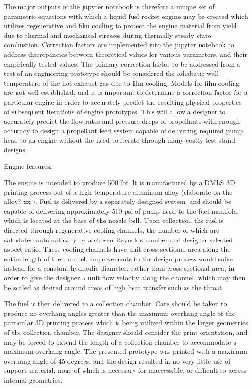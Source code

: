 \documentclass[]{aiaa-tc}%
\begin{document}
The major outputs of the jupyter notebook is therefore a unique set of parametric equations with which a liquid fuel rocket engine may be created which utilizes regenerative and film cooling to protect the engine material from yield due to thermal and mechanical stresses during thermally steady state combustion.
Correction factors are implemented into the jupyter notebook to address discrepancies between theoretical values for various parameters, and their empirically tested values. The primary correction factor to be addressed from a test of an engineering prototype should be considered the adiabatic wall temperature of the hot exhaust gas due to film cooling. Models for film cooling are not well established, and it is important to determine a correction factor for a particular engine in order to accurately predict the resulting physical properties of subsequent iterations of engine prototypes. This will allow a designer to accurately predict the flow rates and pressure drops of propellants with enough accuracy to design a propellant feed system capable of delivering required pump head to an engine without the need to iterate through many costly test stand designs.

Engine features:

The  engine is intended to produce 500 lbf. It is manufactured by a DMLS 3D printing process out of a high temperature aluminum alloy (elaborate on the alloy? xx ). Fuel is delivered by a separately designed system, and should be capable of delivering approximately 500 psi of pump head to the fuel manifold, which is located at the base of the nozzle bell. Upon collection, the fuel is directed through regenerative cooling channels, the number of which are calculated automatically by a chosen Reynolds number and designer selected aspect ratio. These cooling channels have unit cross sectional area along the entire length of the channel. Improvements to the design process would solve instead for a constant hydraulic diameter, rather than cross sectional area, in order to give the designer a unit flow velocity along the channel, which may then be scaled as desired around areas of high heat transfer such as the throat.

The fuel is then delivered to a collection chamber. Care should be taken to produce no overhang angles greater than the maximum overhang angle of the particular 3D printing process which is being utilized within the larger geometries of the collection chamber. The designer should consider the print orientation, and may be forced to extend the length of a collection chamber to accommodate a maximum overhang angle. The presented prototype was printed with a maximum overhang angle of 45 degrees, and the design resulted in no very little use of support material; none of which is necessary for inaccessible, or difficult to access internal geometries.
\end{document}
